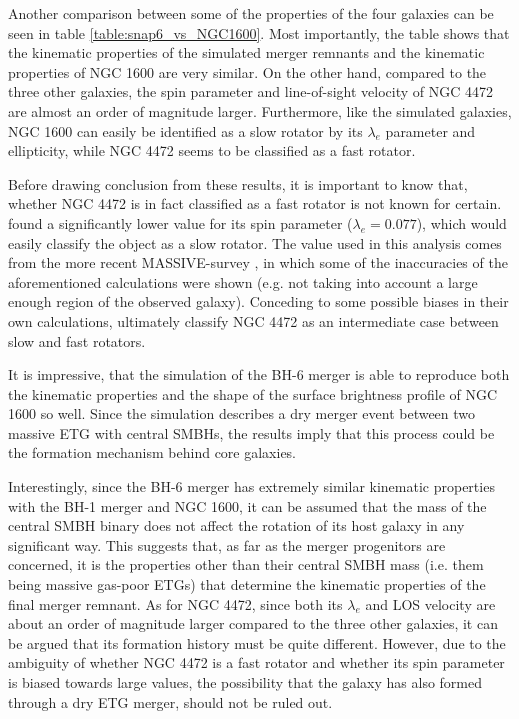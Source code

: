 \documentclass[english, oneside]{HYgradu}
\begin{document}
Another comparison between some of the properties of the four galaxies can be seen in table \ref{table:snap6_vs_NGC1600}. Most importantly, the table shows that the kinematic properties of the simulated merger remnants and the kinematic properties of NGC 1600 are very similar. On the other hand, compared to the three other galaxies, the spin parameter and line-of-sight velocity of NGC 4472 are almost an order of magnitude larger. Furthermore, like the simulated galaxies, NGC 1600 can easily be identified as a slow rotator by its $\lambda_e$ parameter and ellipticity, while NGC 4472 seems to be classified as a fast rotator. 

Before drawing conclusion from these results, it is important to know that, whether NGC 4472 is in fact classified as a fast rotator is not known for certain. \cite{Emsellem2011} found a significantly lower value for its spin parameter ($\lambda_e = 0.077$), which would easily classify the object as a slow rotator. The value used in this analysis comes from the more recent MASSIVE-survey \citep{Ma2014MASSIVE, Veale2017veldisp}, in which some of the inaccuracies of the aforementioned calculations were shown (e.g. not taking into account a large enough region of the observed galaxy). Conceding to some possible biases in their own calculations, \cite{Veale2017veldisp} ultimately classify NGC 4472 as an intermediate case between slow and fast rotators.

It is impressive, that the simulation of the BH-6 merger is able to reproduce both the kinematic properties and the shape of the surface brightness profile of NGC 1600 so well. Since the simulation describes a dry merger event between two massive ETG with central SMBHs, the results imply that this process could be the formation mechanism behind core galaxies. 

Interestingly, since the BH-6 merger has extremely similar kinematic properties with the BH-1 merger and NGC 1600, it can be assumed that the mass of the central SMBH binary does not affect the rotation of its host galaxy in any significant way. This suggests that, as far as the merger progenitors are concerned, it is the properties other than their central SMBH mass (i.e. them being massive gas-poor ETGs) that determine the kinematic properties of the final merger remnant. As for NGC 4472, since both its $\lambda_e$ and LOS velocity are about an order of magnitude larger compared to the three other galaxies, it can be argued that its formation history must be quite different. However, due to the ambiguity of whether NGC 4472 is a fast rotator and whether its spin parameter is biased towards large values, the possibility that the galaxy has also formed through a dry ETG merger, should not be ruled out.
\end{document}
